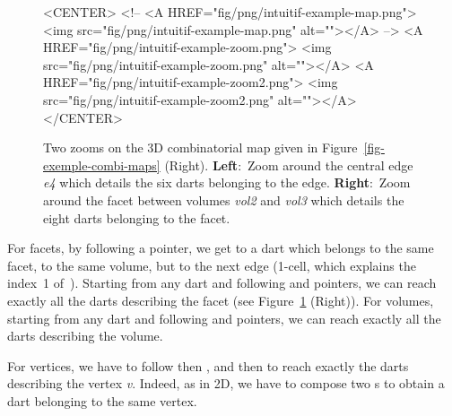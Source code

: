 \begin{figure}
\begin{ccTexOnly}
\begin{center}
    \end{center}
  \end{ccTexOnly}
  \begin{ccHtmlOnly}
    <CENTER>
    <!-- <A HREF="fig/png/intuitif-example-map.png">
    <img src="fig/png/intuitif-example-map.png" alt=""></A> -->
    <A HREF="fig/png/intuitif-example-zoom.png">
        <img src="fig/png/intuitif-example-zoom.png" alt=""></A>
    <A HREF="fig/png/intuitif-example-zoom2.png">
        <img src="fig/png/intuitif-example-zoom2.png" alt=""></A>
    </CENTER>
    \end{ccHtmlOnly}
    \caption{Two zooms on the 3D combinatorial map given in 
      Figure~\ref{fig-exemple-combi-maps} (Right).
      \textbf{Left}:~Zoom around the central edge \emph{e4} which details
      the six darts belonging to the edge.  \textbf{Right}:~Zoom
      around the facet between volumes \emph{vol2} and \emph{vol3} which
      details the eight darts belonging to the facet.}
    \label{fig-intuitive-exemple}
\end{figure}

For facets, by following a \betaun{} pointer, we get to a dart which
belongs to the same facet, to the same volume, but to the next edge
(1-cell, which explains the index~1 of~\betaun{}).  Starting from any
dart and following \betaun{} and \betatrois{} pointers, we can reach
exactly all the darts describing the facet (see
Figure~\ref{fig-intuitive-exemple} (Right)).
%
For volumes, starting from any dart and following \betaun{} and
\betadeux{} pointers, we can reach exactly all the darts describing the
volume.

For vertices, we have to follow \betadeux{} then \betaun{}, and
\betatrois{} then \betaun{} to reach exactly the darts describing the
vertex \emph{v}. Indeed, as in 2D, we have to compose two \betai{}s to
obtain a dart belonging to the same vertex.


